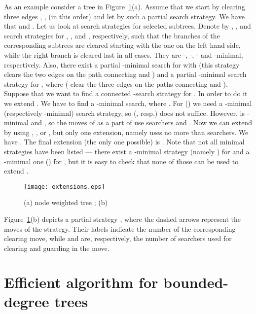 \documentclass[10pt]{article}
\begin{document}
As an example consider a tree in Figure~\ref{pic:extensions}(a). Assume that we start by clearing three edges , ,  (in this order) and let  by such a partial search strategy. We have that  and . Let us look at search strategies for selected subtrees. Denote by , ,  and  search strategies for , ,  and , respectively, such that the branches of the corresponding subtrees are cleared starting with the one on the left hand side, while the right branch is cleared last in all cases. They are \mbox{-,} \mbox{-,} \mbox{-} and -minimal, respectively. Also, there exist a partial -minimal search  for  with  (this strategy clears the two edges on the path connecting  and ) and a partial -minimal search strategy  for , where  ( clear the three edges on the paths connecting  and ). Suppose that we want to find a connected -search strategy for . In order to do it we extend . We have to find a -minimal search, where . For  () we need a -minimal (respectively -minimal) search strategy, so  (, resp.) does not suffice. However,  is -minimal and , so the moves of  as a part of  use  searchers and . Now we can extend  by using , ,  or , but only one extension, namely  uses no more than  searchers. We have . The final extension (the only one possible) is . Note that not all minimal strategies have been listed --- there exist a -minimal strategy (namely ) for  and a -minimal one () for , but it is easy to check that none of those can be used to extend .
\begin{figure}[htb]
\begin{center}
\texttt{[image: extensions.eps]}
\caption{(a) node weighted tree ; (b) }
\label{pic:extensions}
\end{center}
\end{figure}
Figure~\ref{pic:extensions}(b) depicts a partial strategy , where the dashed arrows represent the moves of the strategy. Their labels  indicate the number  of the corresponding clearing move, while  and  are, respectively, the number of searchers used for clearing and guarding in the move.


\section{Efficient algorithm for bounded-degree trees}
\label{sec:bounded_degrees}
\end{document}
